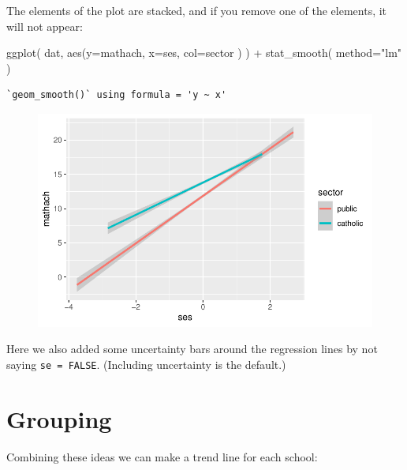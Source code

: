 \documentclass[
  letterpaper,
  DIV=11,
  numbers=noendperiod]{scrreprt}
\newenvironment{Shaded}{\begin{snugshade}}{\end{snugshade}}
\newcommand{\AttributeTok}[1]{\textcolor[rgb]{0.49,0.56,0.16}{#1}}
\newcommand{\FunctionTok}[1]{\textcolor[rgb]{0.02,0.16,0.49}{#1}}
\newcommand{\NormalTok}[1]{\textcolor[rgb]{0.00,0.44,0.13}{#1}}
\newcommand{\SpecialCharTok}[1]{\textcolor[rgb]{0.25,0.44,0.63}{#1}}
\newcommand{\StringTok}[1]{\textcolor[rgb]{0.25,0.44,0.63}{#1}}
\begin{document}
The elements of the plot are stacked, and if you remove one of the
elements, it will not appear:

\begin{Shaded}
\begin{Highlighting}[]
\FunctionTok{ggplot}\NormalTok{( dat, }\FunctionTok{aes}\NormalTok{(}\AttributeTok{y=}\NormalTok{mathach, }\AttributeTok{x=}\NormalTok{ses, }\AttributeTok{col=}\NormalTok{sector ) ) }\SpecialCharTok{+} 
  \FunctionTok{stat\_smooth}\NormalTok{( }\AttributeTok{method=}\StringTok{"lm"}\NormalTok{ )}
\end{Highlighting}
\end{Shaded}

\begin{verbatim}
`geom_smooth()` using formula = 'y ~ x'
\end{verbatim}

\begin{figure}[H]

{\centering \includegraphics{intro_ggplot_files/figure-pdf/unnamed-chunk-5-1.pdf}

}

\end{figure}

Here we also added some uncertainty bars around the regression lines by
not saying \texttt{se\ =\ FALSE}. (Including uncertainty is the
default.)

\hypertarget{grouping}{%
\section{Grouping}\label{grouping}}

Combining these ideas we can make a trend line for each school:
\end{document}
